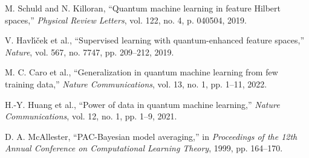 \documentclass{article}
\begin{document}
\begin{thebibliography}{99}

M. Schuld and N. Killoran, ``Quantum machine learning in feature Hilbert spaces,'' \textit{Physical Review Letters}, vol. 122, no. 4, p. 040504, 2019.

V. Havl{\'\i}{\v{c}}ek et al., ``Supervised learning with quantum-enhanced feature spaces,'' \textit{Nature}, vol. 567, no. 7747, pp. 209--212, 2019.

M. C. Caro et al., ``Generalization in quantum machine learning from few training data,'' \textit{Nature Communications}, vol. 13, no. 1, pp. 1--11, 2022.

H.-Y. Huang et al., ``Power of data in quantum machine learning,'' \textit{Nature Communications}, vol. 12, no. 1, pp. 1--9, 2021.

D. A. McAllester, ``PAC-Bayesian model averaging,'' in \textit{Proceedings of the 12th Annual Conference on Computational Learning Theory}, 1999, pp. 164--170.

\end{thebibliography}
\end{document}
